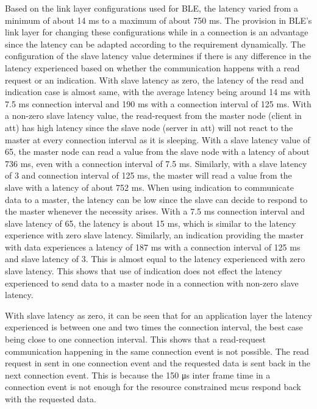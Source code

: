Based on the link layer configurations used for BLE, the latency varied from a minimum of about 14 ms to a maximum of about 750 ms. The provision in BLE's link layer for changing these configurations while in a connection is an advantage since the latency can be adapted according to the requirement dynamically. The configuration of the slave latency value determines if there is any difference in the latency experienced based on whether the communication happens with a read request or an indication. With slave latency as zero, the latency of the read and indication case is almost same, with the average latency being around 14 ms with 7.5 ms connection interval and 190 ms with a connection interval of 125 ms. With a non-zero slave latency value, the read-request from the master node (client in \gls{att}) has high latency since the slave node (server in \gls{att}) will not react to the master at every connection interval as it is sleeping. With a slave latency value of 65, the master node can read a value from the slave node with a latency of about 736 ms, even with a connection interval of 7.5 ms. Similarly, with a slave latency of 3 and connection interval of 125 ms, the master will read a value from the slave with a latency of about 752 ms. When using indication to communicate data to a master, the latency can be low since the slave can decide to respond to the master whenever the necessity arises. With a 7.5 ms connection interval and slave latency of 65, the latency is about 15 ms, which is similar to the latency experience with zero slave latency. Similarly, an indication providing the master with data experiences a latency of 187 ms with a connection interval of 125 ms and slave latency of 3. This is almost equal to the latency experienced with zero slave latency. This shows that use of indication does not effect the latency experienced to send data to a master node in a connection with non-zero slave latency.

With slave latency as zero, it can be seen that for an application layer the latency experienced is between one and two times the connection interval, the best case being close to one connection interval. This shows that a read-request communication happening in the same connection event is not possible. The read request in sent in one connection event and the requested data is sent back in the next connection event. This is because the 150 \si{\micro \second} inter frame time in a connection event is not enough for the resource constrained \glspl{mcu} respond back with the requested data.

